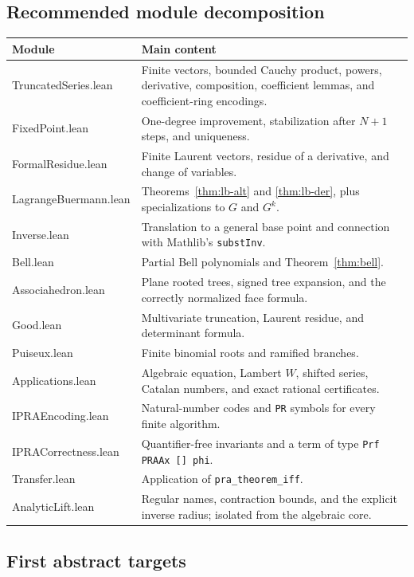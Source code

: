 \documentclass[11pt]{article}
\theoremstyle{definition}
\newcommand{\code}[1]{\texttt{#1}}
\begin{document}
\subsection{Recommended module decomposition}

\begin{longtable}{>{\ttfamily}p{}p{}}
\toprule
Module & Main content\\
\midrule
TruncatedSeries.lean & Finite vectors, bounded Cauchy product, powers,
derivative, composition, coefficient lemmas, and coefficient-ring encodings.\\
FixedPoint.lean & One-degree improvement, stabilization after \(N+1\) steps,
and uniqueness.\\
FormalResidue.lean & Finite Laurent vectors, residue of a derivative, and
change of variables.\\
LagrangeBuermann.lean & Theorems~\ref{thm:lb-alt} and \ref{thm:lb-der}, plus
specializations to \(G\) and \(G^k\).\\
Inverse.lean & Translation to a general base point and connection with
Mathlib's \code{substInv}.\\
Bell.lean & Partial Bell polynomials and Theorem~\ref{thm:bell}.\\
Associahedron.lean & Plane rooted trees, signed tree expansion, and the
correctly normalized face formula.\\
Good.lean & Multivariate truncation, Laurent residue, and determinant formula.\\
Puiseux.lean & Finite binomial roots and ramified branches.\\
Applications.lean & Algebraic equation, Lambert \(W\), shifted series, Catalan
numbers, and exact rational certificates.\\
IPRAEncoding.lean & Natural-number codes and \code{PR} symbols for every
finite algorithm.\\
IPRACorrectness.lean & Quantifier-free invariants and a term of type
\code{Prf PRAAx [] phi}.\\
Transfer.lean & Application of \code{pra\_theorem\_iff}.\\
AnalyticLift.lean & Regular names, contraction bounds, and the explicit inverse
radius; isolated from the algebraic core.\\
\bottomrule
\end{longtable}

\subsection{First abstract targets}
\end{document}
